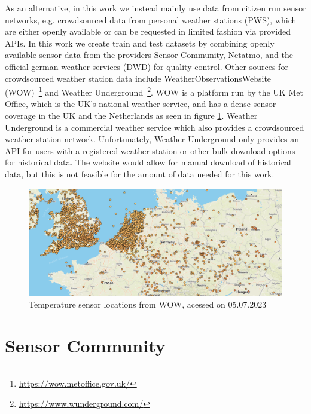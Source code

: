 As an alternative, in this work we instead mainly use data from citizen run sensor networks, e.g. crowdsourced data from personal weather stations (PWS), which are either openly available or can be requested in limited fashion via provided APIs. In this work we create train and test datasets by combining openly available sensor data from the providers Sensor Community, Netatmo, and the official german weather services (DWD) for quality control. Other sources for crowdsourced weather station data include WeatherObservationsWebsite (WOW)~\footnote{\url{https://wow.metoffice.gov.uk/}} and Weather Underground~\footnote{\url{https://www.wunderground.com/}}. WOW is a platform run by the UK Met Office, which is the UK's national weather service, and has a dense sensor coverage in the UK and the Netherlands as seen in figure \ref{fig:wow sensor locations}. Weather Underground is a commercial weather service which also provides a crowdsourced weather station network. Unfortunately, Weather Underground only provides an API for users with a registered weather station or other bulk download options for historical data. The website would allow for manual download of historical data, but this is not feasible for the amount of data needed for this work.

\begin{figure}[ht]
    \centering
    \includegraphics[width=1\textwidth]{images/wow_sensor_locations.png}
    \caption{Temperature sensor locations from WOW, acessed on 05.07.2023}
    \label{fig:wow sensor locations}
\end{figure}

\section{Sensor Community}

